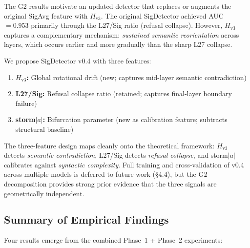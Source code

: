 \documentclass[12pt,a4paper]{article}
\begin{document}
The G2 results motivate an updated detector that replaces or augments the original SigAvg feature with $H_{\text{v3}}$. The original SigDetector achieved AUC $= 0.953$ primarily through the L27/Sig ratio (refusal collapse). However, $H_{\text{v3}}$ captures a complementary mechanism: \textit{sustained semantic reorientation} across layers, which occurs earlier and more gradually than the sharp L27 collapse.

We propose SigDetector v0.4 with three features:
\begin{enumerate}[leftmargin=*]
    \item \textbf{$H_{\text{v3}}$:} Global rotational drift (new; captures mid-layer semantic contradiction)
    \item \textbf{L27/Sig:} Refusal collapse ratio (retained; captures final-layer boundary failure)
    \item \textbf{storm$|a|$:} Bifurcation parameter (new as calibration feature; subtracts structural baseline)
\end{enumerate}

The three-feature design maps cleanly onto the theoretical framework: $H_{\text{v3}}$ detects \textit{semantic contradiction}, L27/Sig detects \textit{refusal collapse}, and storm$|a|$ calibrates against \textit{syntactic complexity}. Full training and cross-validation of v0.4 across multiple models is deferred to future work (§4.4), but the G2 decomposition provides strong prior evidence that the three signals are geometrically independent.

\subsection{Summary of Empirical Findings}

Four results emerge from the combined Phase~1 + Phase~2 experiments:
\end{document}
